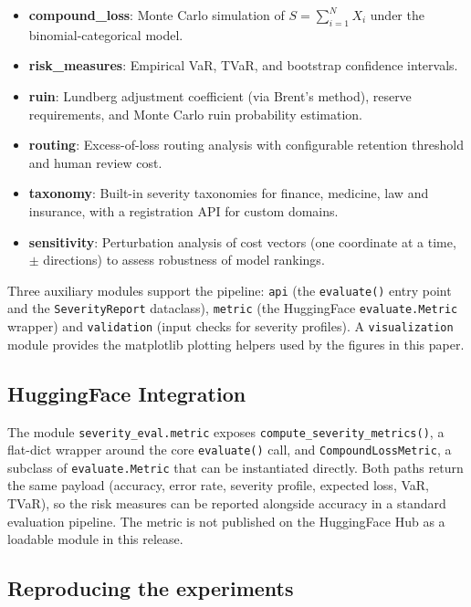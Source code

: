 \documentclass[11pt]{article}
\begin{document}
\begin{itemize}
  \item \textbf{compound\_loss}: Monte Carlo simulation of
    $S = \sum_{i=1}^{N} X_i$ under the binomial-categorical model.
  \item \textbf{risk\_measures}: Empirical VaR, TVaR, and bootstrap
    confidence intervals.
  \item \textbf{ruin}: Lundberg adjustment coefficient (via Brent's
    method), reserve requirements, and Monte Carlo ruin probability
    estimation.
  \item \textbf{routing}: Excess-of-loss routing analysis with
    configurable retention threshold and human review cost.
  \item \textbf{taxonomy}: Built-in severity taxonomies for finance,
    medicine, law and insurance, with a
    registration API for custom domains.
  \item \textbf{sensitivity}: Perturbation analysis of cost vectors
    (one coordinate at a time, $\pm$ directions) to assess robustness
    of model rankings.
\end{itemize}

Three auxiliary modules support the pipeline: \texttt{api} (the
\texttt{evaluate()} entry point and the \texttt{SeverityReport}
dataclass), \texttt{metric} (the HuggingFace \texttt{evaluate.Metric}
wrapper) and \texttt{validation} (input checks for severity profiles).
A \texttt{visualization} module provides the matplotlib plotting
helpers used by the figures in this paper.

\subsection{HuggingFace Integration}

The module \texttt{severity\_eval.metric} exposes
\texttt{compute\_severity\_metrics()}, a flat-dict wrapper around
the core \texttt{evaluate()} call, and \texttt{CompoundLossMetric},
a subclass of \texttt{evaluate.Metric} that can be instantiated
directly. Both paths return the same payload (accuracy, error rate,
severity profile, expected loss, VaR, TVaR), so the risk measures
can be reported alongside accuracy in a standard evaluation
pipeline. The metric is not published on the HuggingFace Hub as a
loadable module in this release.

\subsection{Reproducing the experiments}
\end{document}
